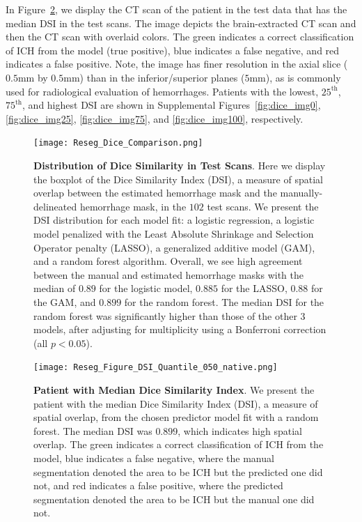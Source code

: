 In Figure~\ref{fig:dice_img}, we display the CT scan of the patient in the test data that has the median DSI in the test scans. The image depicts the brain-extracted CT scan and then the CT scan with overlaid colors.  The green indicates a correct classification of ICH from the model (true positive), blue indicates a false negative, and red indicates a false positive.  Note, the image has finer resolution in the axial slice ($0.5$mm by $0.5$mm) than in the inferior/superior planes ($5$mm), as is commonly used for radiological evaluation of hemorrhages.  Patients with the lowest, $25^{\text{th}}$, $75^{\text{th}}$, and highest DSI are shown in Supplemental Figures~\ref{fig:dice_img0}, \ref{fig:dice_img25}, \ref{fig:dice_img75}, and \ref{fig:dice_img100}, respectively.



\begin{figure}
\centering
\texttt{[image: Reseg\_Dice\_Comparison.png]}
\caption{{\bf Distribution of Dice Similarity in Test Scans}.  Here we display the boxplot of the Dice Similarity Index (DSI), a measure of spatial overlap between the estimated hemorrhage mask and the manually-delineated hemorrhage mask, in the $102$ test scans.  We present the DSI distribution for each model fit: a logistic regression, a logistic model penalized with the Least Absolute Shrinkage and Selection Operator penalty (LASSO), a generalized additive model (GAM), and a random forest algorithm.  Overall, we see high agreement between the manual and estimated hemorrhage masks with the median of $0.89$ for the logistic model, $0.885$ for the LASSO, $0.88$ for the GAM, and $0.899$ for the random forest. The median DSI for the random forest was significantly higher than those of the other 3 models, after adjusting for multiplicity using a Bonferroni correction (all $p < 0.05$).   }
\label{fig:dice}
\end{figure}



\begin{figure}
\centering
\texttt{[image: Reseg\_Figure\_DSI\_Quantile\_050\_native.png]}
\caption{{\bf Patient with Median Dice Similarity Index}. We present the patient with the median Dice Similarity Index (DSI), a measure of spatial overlap, from the chosen predictor model fit with a random forest.  The median DSI was $0.899$, which indicates high spatial overlap. The green indicates a correct classification of ICH from the model, blue indicates a false negative, where the manual segmentation denoted the area to be ICH but the predicted one did not, and red indicates a false positive, where the predicted segmentation denoted the area to be ICH but the manual one did not. }
\label{fig:dice_img}
\end{figure}

